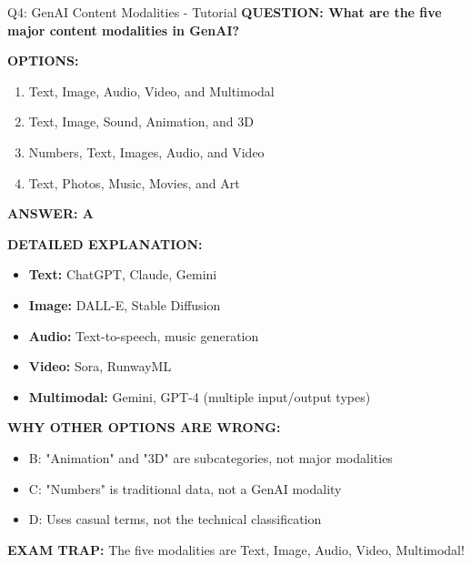 \documentclass[8pt]{beamer}
\begin{document}
	\begin{frame}{Q4: GenAI Content Modalities - Tutorial}
		\fontsize{6.5}{7.5}\selectfont
		\textbf{QUESTION: What are the five major content modalities in GenAI?}
		
		\vspace{0.1cm}
		\textbf{OPTIONS:}
		\begin{enumerate}
			\item Text, Image, Audio, Video, and Multimodal
			\item Text, Image, Sound, Animation, and 3D
			\item Numbers, Text, Images, Audio, and Video
			\item Text, Photos, Music, Movies, and Art
		\end{enumerate}
		
		\vspace{0.1cm}
		\textcolor{myblue}{\textbf{ANSWER: A}}
		
		\vspace{0.1cm}
		\textbf{DETAILED EXPLANATION:}
		\begin{itemize}
			\item \textbf{Text:} ChatGPT, Claude, Gemini
			\item \textbf{Image:} DALL-E, Stable Diffusion
			\item \textbf{Audio:} Text-to-speech, music generation
			\item \textbf{Video:} Sora, RunwayML
			\item \textbf{Multimodal:} Gemini, GPT-4 (multiple input/output types)
		\end{itemize}
		
		\vspace{0.1cm}
		\textcolor{myred}{\textbf{WHY OTHER OPTIONS ARE WRONG:}}
		\begin{itemize}
			\item \textcolor{myred}{B:} "Animation" and "3D" are subcategories, not major modalities
			\item \textcolor{myred}{C:} "Numbers" is traditional data, not a GenAI modality
			\item \textcolor{myred}{D:} Uses casual terms, not the technical classification
		\end{itemize}
		
		\textcolor{myred}{\textbf{EXAM TRAP:}} The five modalities are \textcolor{myblue}{Text, Image, Audio, Video, Multimodal}!
	\end{frame}
	
\end{document}
